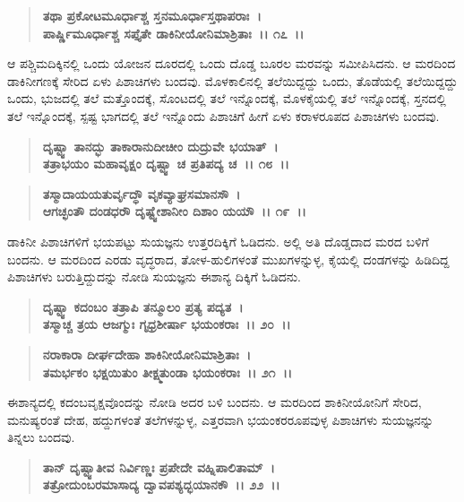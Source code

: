 \begin{verse}
\textbf{ತಥಾ ಪ್ರಕೋಟಮೂರ್ಧಾಶ್ಚ ಸ್ತನಮೂರ್ಧಾಸ್ತಥಾಪರಾಃ~।}\\\textbf{ಪಾರ್ಷ್ಣಿಮೂರ್ಧಾಶ್ಚ ಸಪ್ತೈತೇ ಡಾಕಿನೀಯೋನಿಮಾಶ್ರಿತಾಃ~।। ೧೭~।।}
\end{verse}

ಆ ಪಶ್ಚಿಮದಿಕ್ಕಿನಲ್ಲಿ ಒಂದು ಯೋಜನ ದೂರದಲ್ಲಿ ಒಂದು ದೊಡ್ಡ ಬೂರಲ ಮರವನ್ನು ಸಮೀಪಿಸಿದನು. ಆ ಮರದಿಂದ ಡಾಕಿನೀಗಣಕ್ಕೆ ಸೇರಿದ ಏಳು ಪಿಶಾಚಿಗಳು ಬಂದವು. ಮೊಳಕಾಲಿನಲ್ಲಿ ತಲೆಯಿದ್ದದ್ದು ಒಂದು, ತೊಡೆಯಲ್ಲಿ ತಲೆಯಿದ್ದದ್ದು ಒಂದು, ಭುಜದಲ್ಲಿ ತಲೆ ಮತ್ತೊಂದಕ್ಕೆ, ಸೊಂಟದಲ್ಲಿ ತಲೆ ಇನ್ನೊಂದಕ್ಕೆ, ಮೊಳಕೈಯಲ್ಲಿ ತಲೆ ಇನ್ನೊಂದಕ್ಕೆ, ಸ್ತನದಲ್ಲಿ ತಲೆ ಇನ್ನೊಂದಕ್ಕೆ, ಸ್ಪಷ್ಟ ಭಾಗದಲ್ಲಿ ತಲೆ ಇನ್ನೊಂದು ಪಿಶಾಚಿಗೆ ಹೀಗೆ ಏಳು ಕರಾಳರೂಪದ ಪಿಶಾಚಿಗಳು ಬಂದವು.

\begin{verse}
\textbf{ದೃಷ್ಟ್ವಾ ತಾನದ್ಭು ತಾಕಾರಾನುದೀಚೀಂ ದುದ್ರುವೇ ಭಯಾತ್~।}\\\textbf{ತತ್ರಾಭಯಂ ಮಹಾವೃಕ್ಷಂ ದೃಷ್ಟ್ವಾ ಚ ಪ್ರತಿಪದ್ಯ ಚ~।। ೧೮~।।} 
\end{verse}

\begin{verse}
\textbf{ತಸ್ಮಾದಾಯಯತುರ್ವೃದ್ಧೌ ವೃಕವ್ಯಾಘ್ರಸಮಾನಸೌ~।}\\\textbf{ಆಗಚ್ಛಂತೌ ದಂಡಧರೌ ದೃಷ್ಟ್ವೇಶಾನೀಂ ದಿಶಾಂ ಯಯೌ~।। ೧೯~।।}
\end{verse}

ಡಾಕಿನೀ ಪಿಶಾಚಿಗಳಿಗೆ ಭಯಪಟ್ಟು ಸುಯಜ್ಞನು ಉತ್ತರದಿಕ್ಕಿಗೆ ಓಡಿದನು. ಅಲ್ಲಿ ಅತಿ ದೊಡ್ಡದಾದ ಮರದ ಬಳಿಗೆ ಬಂದನು. ಆ ಮರದಿಂದ ಎರಡು ವೃದ್ಧರಾದ, ತೋಳ-\-ಹುಲಿಗಳಂತೆ ಮುಖಗಳನ್ನುಳ್ಳ, ಕೈಯಲ್ಲಿ ದಂಡಗಳನ್ನು ಹಿಡಿದಿದ್ದ ಪಿಶಾಚಿಗಳು ಬರುತ್ತಿದ್ದುದನ್ನು ನೋಡಿ ಸುಯಜ್ಞನು ಈಶಾನ್ಯ ದಿಕ್ಕಿಗೆ ಓಡಿದನು.

\begin{verse}
\textbf{ದೃಷ್ಟ್ವಾ ಕದಂಬಂ ತತ್ರಾಪಿ ತನ್ಮೂಲಂ ಪ್ರತ್ಯ ಪದ್ಯತ~।}\\\textbf{ತಸ್ಮಾಚ್ಚ ತ್ರಯ ಆಜಗ್ಮುಃ ಗೃಧ್ರಶೀರ್ಷಾ ಭಯಂಕರಾಃ~।। ೨೦~।। }
\end{verse}

\begin{verse}
\textbf{ನರಾಕಾರಾ ದೀರ್ಘದೇಹಾ ಶಾಕಿನೀಯೋನಿಮಾಶ್ರಿತಾಃ~।}\\\textbf{ತಮರ್ಭಕಂ ಭಕ್ಷಯಿತುಂ ತೀಕ್ಷ್ಮತುಂಡಾ ಭಯಂಕರಾಃ~।। ೨೧~।।}
\end{verse}

ಈಶಾನ್ಯದಲ್ಲಿ ಕದಂಬವೃಕ್ಷವೊಂದನ್ನು ನೋಡಿ ಅದರ ಬಳಿ ಬಂದನು. ಆ ಮರದಿಂದ ಶಾಕಿನೀಯೋನಿಗೆ ಸೇರಿದ, ಮನುಷ್ಯರಂತೆ ದೇಹ, ಹದ್ದುಗಳಂತೆ ತಲೆಗಳನ್ನುಳ್ಳ, ಎತ್ತರವಾಗಿ ಭಯಂಕರರೂಪವುಳ್ಳ ಪಿಶಾಚಿಗಳು ಸುಯಜ್ಞನನ್ನು ತಿನ್ನಲು ಬಂದವು.

\begin{verse}
\textbf{ತಾನ್ ದೃಷ್ಟ್ವಾತೀವ ನಿರ್ವಿಣ್ಣಃ ಪ್ರಪೇದೇ ವಹ್ನಿಪಾಲಿತಾಮ್~।}\\\textbf{ತತ್ರೋದುಂಬರಮಾಸಾದ್ಯ ದ್ವಾವಪಶ್ಯದ್ಭಯಾನಕೌ~।। ೨೨~।। }
\end{verse}


